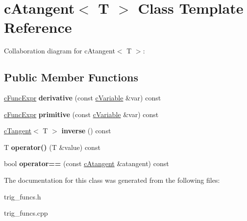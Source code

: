 \hypertarget{classcAtangent}{\section{c\-Atangent$<$ T $>$ Class Template Reference}
\label{classcAtangent}
}


Collaboration diagram for c\-Atangent$<$ T $>$\-:
\subsection*{Public Member Functions}
\begin{DoxyCompactItemize}
\item 
\hypertarget{classcAtangent_acb2185d21912383099cfa3cc127c32e3}{\hyperlink{classcFuncExpr}{c\-Func\-Expr} {\bfseries derivative} (const \hyperlink{classcVariable}{c\-Variable} \&var) const }\label{classcAtangent_acb2185d21912383099cfa3cc127c32e3}

\item 
\hypertarget{classcAtangent_a491152275d88f8034e5416e38a16c87f}{\hyperlink{classcFuncExpr}{c\-Func\-Expr} {\bfseries primitive} (const \hyperlink{classcVariable}{c\-Variable} \&var) const }\label{classcAtangent_a491152275d88f8034e5416e38a16c87f}

\item 
\hypertarget{classcAtangent_aaaf239a12f159f949ad252ebdbd7fb81}{\hyperlink{classcTangent}{c\-Tangent}$<$ T $>$ {\bfseries inverse} () const }\label{classcAtangent_aaaf239a12f159f949ad252ebdbd7fb81}

\item 
\hypertarget{classcAtangent_a9701d426c4c84da27e31a118baa8f017}{T {\bfseries operator()} (T \&value) const }\label{classcAtangent_a9701d426c4c84da27e31a118baa8f017}

\item 
\hypertarget{classcAtangent_a4ba37143f37404f92472e8f6e0050924}{bool {\bfseries operator==} (const \hyperlink{classcAtangent}{c\-Atangent} \&atangent) const }\label{classcAtangent_a4ba37143f37404f92472e8f6e0050924}

\end{DoxyCompactItemize}


The documentation for this class was generated from the following files\-:\begin{DoxyCompactItemize}
\item 
trig\-\_\-funcs.\-h\item 
trig\-\_\-funcs.\-cpp\end{DoxyCompactItemize}
